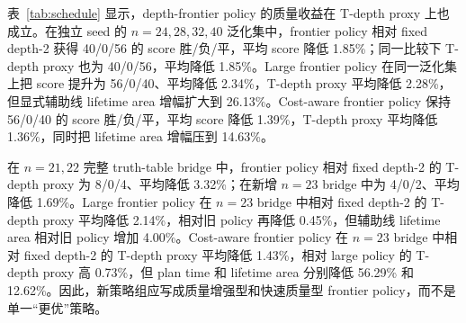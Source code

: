 \documentclass[UTF8,fontset=macnew,11pt]{ctexart}
\newcommand{\ttable}{truth-table}
\begin{document}
表~\ref{tab:schedule} 显示，depth-frontier policy 的质量收益在 T-depth proxy 上也成立。在独立 seed 的 $n=24,28,32,40$ 泛化集中，frontier policy 相对 fixed depth-2 获得 40/0/56 的 score 胜/负/平，平均 score 降低 1.85\%；同一比较下 T-depth proxy 也为 40/0/56，平均降低 1.85\%。Large frontier policy 在同一泛化集上把 score 提升为 56/0/40、平均降低 2.34\%，T-depth proxy 平均降低 2.28\%，但显式辅助线 lifetime area 增幅扩大到 26.13\%。Cost-aware frontier policy 保持 56/0/40 的 score 胜/负/平，平均 score 降低 1.39\%，T-depth proxy 平均降低 1.36\%，同时把 lifetime area 增幅压到 14.63\%。

在 $n=21,22$ 完整 \ttable{} bridge 中，frontier policy 相对 fixed depth-2 的 T-depth proxy 为 8/0/4、平均降低 3.32\%；在新增 $n=23$ bridge 中为 4/0/2、平均降低 1.69\%。Large frontier policy 在 $n=23$ bridge 中相对 fixed depth-2 的 T-depth proxy 平均降低 2.14\%，相对旧 policy 再降低 0.45\%，但辅助线 lifetime area 相对旧 policy 增加 4.00\%。Cost-aware frontier policy 在 $n=23$ bridge 中相对 fixed depth-2 的 T-depth proxy 平均降低 1.43\%，相对 large policy 的 T-depth proxy 高 0.73\%，但 plan time 和 lifetime area 分别降低 56.29\% 和 12.62\%。因此，新策略组应写成质量增强型和快速质量型 frontier policy，而不是单一“更优”策略。
\end{document}
